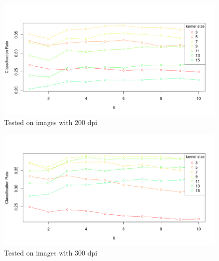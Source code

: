 \begin{figure}[H]
\includegraphics[width = \textwidth]{figure/data_200_15_10.png}
\caption{Tested on images with 200 dpi}
\label{fig:data_200}
\end{figure}

\begin{figure}[H]
\includegraphics[width = \textwidth]{figure/data_300_15_10.png}
\caption{Tested on images with 300 dpi}
\label{data_300}
\end{figure}
